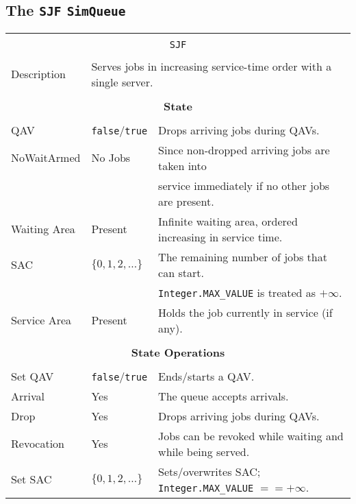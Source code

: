 \documentclass[12pt]{book}
\begin{document}
\subsection{The \lstinline{SJF} \lstinline{SimQueue}}

\begin{tabular}{|l|l|l|}
\hline
\multicolumn{3}{|c|}{} \\
\multicolumn{3}{|c|}{\lstinline[basicstyle=\large]{SJF}} \\
\multicolumn{3}{|c|}{} \\
\hline
Description & \multicolumn{2}{|l|}{Serves jobs in increasing service-time order with a single server.} \\
\hline
\multicolumn{3}{|c|}{} \\
\multicolumn{3}{|c|}{\bf State} \\
\multicolumn{3}{|c|}{} \\
\hline
QAV & \lstinline|false|/\lstinline|true| & Drops arriving jobs during QAVs. \\
\hline
NoWaitArmed & No Jobs & Since non-dropped arriving jobs are taken into \\
            &         & service immediately if no other jobs are present. \\
\hline
Waiting Area & Present & Infinite waiting area, ordered increasing in service time. \\
\hline
SAC & $\{0, 1, 2, \ldots\}$ & The remaining number of jobs that can start. \\
    &                       & \lstinline|Integer.MAX_VALUE| is treated as $+\infty$. \\
\hline
Service Area & Present & Holds the job currently in service (if any). \\
\hline
\multicolumn{3}{|c|}{} \\
\multicolumn{3}{|c|}{\bf State Operations} \\
\multicolumn{3}{|c|}{} \\
\hline
Set QAV & \lstinline|false|/\lstinline|true| & Ends/starts a QAV. \\
\hline
Arrival & Yes & The queue accepts arrivals. \\
\hline
Drop & Yes & Drops arriving jobs during QAVs. \\
\hline
Revocation & Yes & Jobs can be revoked while waiting and while being served. \\
\hline
Set SAC & $\{0, 1, 2, \ldots\}$ & Sets/overwrites SAC; \lstinline|Integer.MAX_VALUE| $== +\infty$. \\

\end{tabular}
\end{document}
